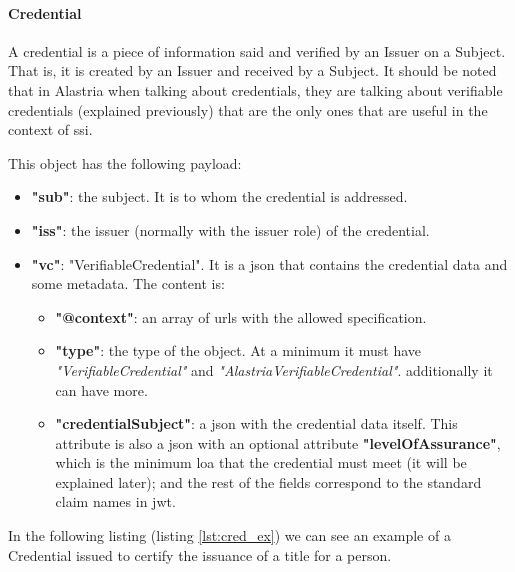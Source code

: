\documentclass[a4paper, 12pt]{article} %
\begin{document}
            \paragraph{Credential}
                A credential is a piece of information said and verified by an Issuer on a Subject. That is, it is created by an Issuer and received by a Subject. It should be noted that in Alastria when talking about credentials, they are talking about verifiable credentials (explained previously) that are the only ones that are useful in the context of \acrlong{ssi}.
                
                This object has the following payload:
                \begin{itemize}
                    \item \textbf{"sub"}: the subject. It is to whom the credential is addressed.
                    \item \textbf{"iss"}: the issuer (normally with the issuer role) of the credential.
                    \item \textbf{"vc"}: "VerifiableCredential". It is a \acrshort{json} that contains the credential data and some metadata. The content is:
                    \begin{itemize}
                        \item \textbf{"@context"}: an array of \acrshort{url}s with the allowed specification.
                        \item \textbf{"type"}: the type of the object. At a minimum it must have \textit{"VerifiableCredential"} and \textit{"AlastriaVerifiableCredential"}. additionally it can have more.
                        \item \textbf{"credentialSubject"}: a \acrshort{json} with the credential data itself. This attribute is also a \acrshort{json} with an optional attribute \textbf{"levelOfAssurance"}, which is the minimum \acrlong{loa} that the credential must meet (it will be explained later); and the rest of the fields correspond to the standard claim names in \acrshort{jwt}.
                    \end{itemize}
                \end{itemize}
                In the following listing (listing \ref{lst:cred_ex}) we can see an example of a Credential issued to certify the issuance of a title for a person.
                
\end{document}
